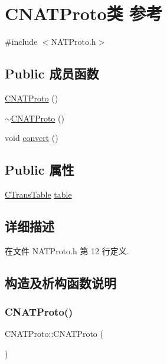 \hypertarget{class_c_n_a_t_proto}{}\section{C\+N\+A\+T\+Proto类 参考}
\label{class_c_n_a_t_proto}


{\ttfamily \#include $<$N\+A\+T\+Proto.\+h$>$}

\subsection*{Public 成员函数}
\begin{DoxyCompactItemize}
\item 
\hyperlink{class_c_n_a_t_proto_a196de69028f8ed5b6a16bd439e07273d}{C\+N\+A\+T\+Proto} ()
\item 
\hyperlink{class_c_n_a_t_proto_a61d0e52fb1019c3b505ef28c5c7664f4}{$\sim$\+C\+N\+A\+T\+Proto} ()
\item 
void \hyperlink{class_c_n_a_t_proto_a249f93030dfaa686dfffb0f785658ca4}{convert} ()
\end{DoxyCompactItemize}
\subsection*{Public 属性}
\begin{DoxyCompactItemize}
\item 
\hyperlink{class_c_trans_table}{C\+Trans\+Table} \hyperlink{class_c_n_a_t_proto_a7fde6c1c8e6840ae207f305e85288668}{table}
\end{DoxyCompactItemize}


\subsection{详细描述}


在文件 N\+A\+T\+Proto.\+h 第 12 行定义.



\subsection{构造及析构函数说明}
\mbox{\label{class_c_n_a_t_proto_a196de69028f8ed5b6a16bd439e07273d}} 
\subsubsection{\texorpdfstring{C\+N\+A\+T\+Proto()}{CNATProto()}}
{\footnotesize\ttfamily C\+N\+A\+T\+Proto\+::\+C\+N\+A\+T\+Proto (\begin{DoxyParamCaption}{ }\end{DoxyParamCaption})}



